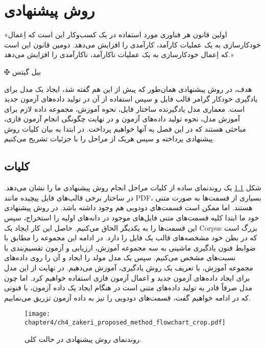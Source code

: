 
\chapter{روش پیشنهادی}\label{ch:4}
\thispagestyle{empty}


\epigraph{
	«اولین قانون هر فناوری مورد استفاده در یک کسب‌وکار این است که اِعمال خودکارسازی به یک عملیات کارآمد، کارآمدی را افزایش می‌دهد. دومین قانون این است که اِعمال خودکارسازی به یک عملیات ناکارآمد، ناکارآمدی را افزایش می‌دهد.»
}
{$ \maltese $ {\large بیل گیتس}}

\noindent
هدف، در روش پیشنهادی همان‌طور که پیش‌ از این هم گفته شد، ایجاد یک مدل برای یادگیری خودکار گرامر قالب فایل و سپس استفاده از آن در تولید داده‌های آزمون جدید است. معماری مدل یادگیرنده ساختار فایل، نحوه آموزش، مجموعه داده لازم برای آموزش مدل، نحوه تولید داده‌های آزمون و در نهایت چگونگی انجام آزمون فازی، مباحثی هستند که در این فصل به آنها خواهیم پرداخت. در ابتدا به بیان کلیات روش پیشنهادی پرداخته و سپس هریک از مراحل را با جزئیات تشریح می‌کنیم.


\section{کلیات}
شکل \ref{ch4_zakeri_proposed_method_flowchart_crop.pdf} یک روندنمای ساده از کلیات مراحل انجام روش پیشنهادی ما را نشان می‌دهد. در ساختار برخی قالب‌های فایل پیچیده مانند \gls{PDF}، بسیاری از قسمت‌ها به صورت متنی هستند. اما ممکن است قسمت‌های دودویی هم وجود داشته باشد. در روش پیشنهادی خود ما ابتدا کلیه قسمت‌های متنی فایل‌های موجود در دانه‌های اولیه را استخراج، سپس این قسمت‌ها را به یکدیگر الحاق می‌کنیم. حاصل این کار ایجاد یک \gls{Corpus} بزرگ است که در بطن خود مشخصه‌های قالب یک فایل را دارد. در ادامه این مجموعه را مطابق با ضوابط فنون یادگیری ماشینی به سه مجموعه آموزش، ارزیابی و آزمون تقسیم‌بندی با نسبت‌های مشخص می‌کنیم. سپس یک مدل مولد را ایجاد و آن را روی داده‌های مجموعه آموزش، با تعریف یک روش یادگیری، آموزش می‌دهیم. در نهایت از این مدل برای ایجاد داده‌های آزمون جدید و اعمال آزمون فازی استفاده خواهیم کرد. اما چون مدل صرفاً قادر به تولید داده‌های متنی است در هنگام ایجاد یک داده آزمون، با فنونی که در ادامه خواهیم گفت، قسمت‌های دودویی را نیز به داده آزمون تزریق می‌نماییم. 


\begin{figure}%
	\centering
	\texttt{[image: chapter4/ch4\_zakeri\_proposed\_method\_flowchart\_crop.pdf]}
	\caption[روندنمای روش پیشنهادی در حالت کلی]
	{
		روندنمای روش پیشنهادی در حالت کلی.
	}
	\label{ch4_zakeri_proposed_method_flowchart_crop.pdf}
\end{figure}


